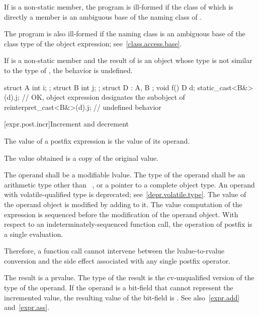 \pnum
If  is a non-static member,
the program is ill-formed if the class of which  is
directly a member is an ambiguous base of
the naming class of .
\begin{note}
The program is also ill-formed if the naming class is an ambiguous base of the class type
of the object expression; see~\ref{class.access.base}.
\end{note}

\pnum
If  is a non-static member and
the result of  is an object whose type
is not similar to the type of ,
the behavior is undefined.
\begin{example}
\begin{codeblock}
struct A { int i; };
struct B { int j; };
struct D : A, B {};
void f() {
  D d;
  static_cast<B&>(d).j;             // OK, object expression designates the  subobject of 
  reinterpret_cast<B&>(d).j;        // undefined behavior
}
\end{codeblock}
\end{example}

[expr.post.incr]{Increment and decrement}

\pnum
{}%
%
%
%
The value of a postfix \tcode{++} expression is the value of its
operand.
\begin{note}
The value obtained is a copy of the original value.
\end{note}
The operand shall be a modifiable lvalue. The type of the operand shall
be an arithmetic type other than \cv{}~,
or a pointer to a complete object type.
An operand with volatile-qualified type is deprecated;
see~\ref{depr.volatile.type}.
The value of the operand object is modified
by adding  to it.
The
%
value computation of the \tcode{++} expression is sequenced before the
modification of the operand object. With respect to an
indeterminately-sequenced function call, the operation of postfix
\tcode{++} is
a single evaluation.
\begin{note}
Therefore, a function call cannot intervene between the
lvalue-to-rvalue conversion and the side effect associated with any
single postfix \tcode{++} operator.
\end{note}
The result is a prvalue. The type of the result is the cv-unqualified
version of the type of the operand.
If the operand is a bit-field that cannot represent the incremented value, the
resulting value of the bit-field is
.
See also~\ref{expr.add}
and~\ref{expr.ass}.

